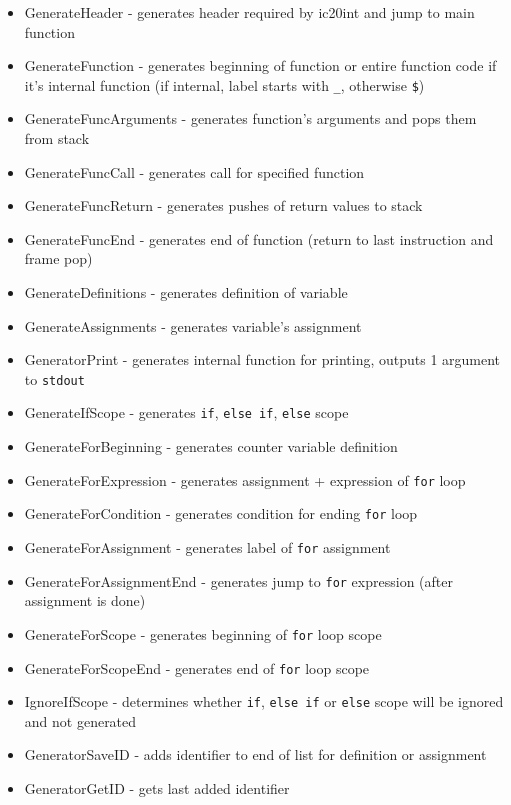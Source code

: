 \documentclass[11pt, titlepage]{article}
\begin{document}
\begin{itemize}[itemsep=-5pt]
\item
  GenerateHeader - generates header required by ic20int and jump to main
  function
\item
  GenerateFunction - generates beginning of function or entire function
  code if it's internal function (if internal, label starts with
  \texttt{\_}, otherwise \texttt{\$})
\item
  GenerateFuncArguments - generates function's arguments and pops them
  from stack
\item
  GenerateFuncCall - generates call for specified function
\item
  GenerateFuncReturn - generates pushes of return values to stack
\item
  GenerateFuncEnd - generates end of function (return to last
  instruction and frame pop)
\item
  GenerateDefinitions - generates definition of variable
\item
  GenerateAssignments - generates variable's assignment
\item
  GeneratorPrint - generates internal function for printing, outputs 1
  argument to \texttt{stdout}
\item
  GenerateIfScope - generates \texttt{if}, \texttt{else\ if},
  \texttt{else} scope
\item
  GenerateForBeginning - generates counter variable definition
\item
  GenerateForExpression - generates assignment + expression of
  \texttt{for} loop
\item
  GenerateForCondition - generates condition for ending \texttt{for}
  loop
\item
  GenerateForAssignment - generates label of \texttt{for} assignment
\item
  GenerateForAssignmentEnd - generates jump to \texttt{for} expression
  (after assignment is done)
\item
  GenerateForScope - generates beginning of \texttt{for} loop scope
\item
  GenerateForScopeEnd - generates end of \texttt{for} loop scope
\item
  IgnoreIfScope - determines whether \texttt{if}, \texttt{else\ if} or
  \texttt{else} scope will be ignored and not generated
\item
  GeneratorSaveID - adds identifier to end of list for definition or
  assignment
\item
  GeneratorGetID - gets last added identifier

\end{itemize}
\end{document}
